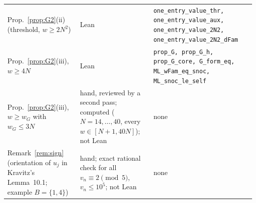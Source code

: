 \documentclass[11pt]{article}
\theoremstyle{definition}
\theoremstyle{remark}
\begin{document}
{\begin{longtable}{@{}p{}p{}p{}@{}}
Prop.~\ref{prop:G2}(ii) (threshold, $w\ge2N^2$) & Lean & \texttt{one\_entry\_value\_thr, one\_entry\_value\_aux, one\_entry\_value\_2N2, one\_entry\_value\_2N2\_dFam} \\
Prop.~\ref{prop:G2}(iii), $w\ge4N$ & Lean & \texttt{prop\_G, prop\_G\_h, prop\_G\_core, G\_form\_eq, ML\_wFam\_eq\_snoc, ML\_snoc\_le\_self} \\
Prop.~\ref{prop:G2}(iii), $w\ge w_G$ with $w_G\le3N$ & hand, reviewed by a second pass; computed ($N=14,\dots,40$, every $w\in[N+1,40N]$); not Lean & none \\
Remark~\ref{rem:sign} (orientation of $u_j$ in Kravitz's Lemma~10.1; example $B=\{1,4\}$) & hand; exact rational check for all $v_n\equiv2\pmod5$, $v_n\le10^5$; not Lean & none \\
\end{longtable}
}
\end{document}
